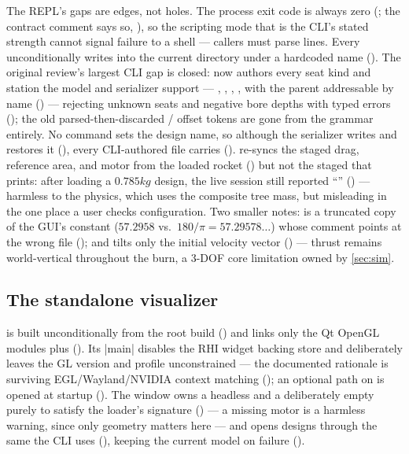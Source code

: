 The REPL's gaps are edges, not holes. The process exit code is always zero
(; the contract comment says so, ), so the scripting
mode that is the CLI's stated strength cannot signal failure to a shell --- callers must parse
 lines. Every  unconditionally writes  into the
current directory under a hardcoded name (). The original review's largest
CLI gap is closed:  now authors every seat kind and station the model and serializer
support --- , , , , with the
parent addressable by name () --- rejecting unknown seats and negative bore
depths with typed errors (); the old parsed-then-discarded
/ offset tokens are gone from the grammar entirely. No command sets the design
name, so although the serializer writes and restores it (),
every CLI-authored file carries  ().
 re-syncs the staged drag, reference area, and motor from the loaded rocket
() but not the staged  that  prints: after
loading a $0.785\unit{kg}$ design, the live session still reported ``''
() --- harmless to the physics, which uses the composite tree mass, but
misleading in the one place a user checks configuration. Two smaller notes: 
is a truncated copy of the GUI's constant ($57.2958$ vs.\ $180/\pi = 57.29578\ldots$) whose
comment points at the wrong file (); and  tilts only the
initial velocity vector () --- thrust remains world-vertical throughout the
burn, a 3-DOF core limitation owned by \cref{sec:sim}.

\subsection{The standalone visualizer}\label{sec:interfaces-viz}

 is built unconditionally from the root build
() and links only the Qt OpenGL modules plus 
(). Its \cppinline|main| disables the RHI widget backing store
and deliberately leaves the GL version and profile unconstrained --- the documented rationale is
surviving EGL/Wayland/NVIDIA context matching (); an optional
 path on  is opened at startup (). The window
owns a headless  and a deliberately empty  purely to
satisfy the loader's signature () --- a missing motor is a
harmless warning, since only geometry matters here --- and opens designs through the same
 the CLI uses (),
keeping the current model on failure ().

